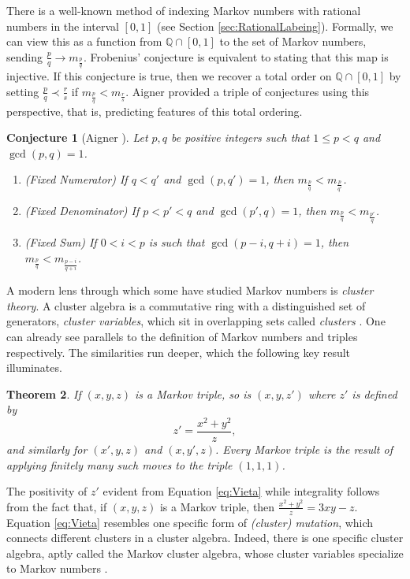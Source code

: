 \documentclass[12pt, letterpaper,table]{amsart}
\newtheorem{theorem}{Theorem}
\newtheorem{conjecture}[theorem]{Conjecture}
\theoremstyle{remark}
\newcommand{\fpq}{\frac{p}{q}}
\newcommand{\frs}{\frac{r}{s}}
\begin{document}
There is a well-known method of indexing Markov numbers with rational numbers in the interval $[0,1]$ (see Section \ref{sec:RationalLabeing}). Formally, we can view this as a function from $\mathbb{Q} \cap [0,1]$ to the set of Markov numbers, sending $\frac{p}{q} \to m_{\frac{p}{q}}$. Frobenius' conjecture is equivalent to stating that this map is injective. If this conjecture is true, then we recover a total order on $\mathbb{Q} \cap [0,1]$ by setting $\fpq \prec \frs$ if $m_\fpq < m_\frs$. Aigner provided a triple of conjectures using this perspective, that is, predicting features of this total ordering.

\begin{conjecture}[Aigner \cite{aigner2013Markov}]\label{conj:Aigner}
Let $p,q$ be positive integers such that $1 \leq p < q$ and $\gcd(p,q) = 1$.
\begin{enumerate}
    \item (Fixed Numerator) If $q < q'$ and $\gcd(p,q') = 1$, then $m_\fpq < m_{\frac{p}{q'}}$.
    \item (Fixed Denominator) If $p < p'< q$ and $\gcd(p',q) = 1$, then $m_\fpq < m_{\frac{p'}{q}}$.
    \item (Fixed Sum) If $0 < i < p$ is such that $\gcd(p-i,q+i) = 1$, then $m_\fpq < m_{\frac{p-i}{q+i}}$.
\end{enumerate}
\end{conjecture}

A modern lens through which some have studied Markov numbers is \emph{cluster theory}. A cluster algebra is a commutative ring with a distinguished set of generators, \emph{cluster variables}, which sit in overlapping sets called \emph{clusters} \cite{fomin2002cluster}. One can already see parallels to the definition of Markov numbers and triples respectively. The similarities run deeper, which the following key result illuminates. 

\begin{theorem}\label{thm:MarkovTreeConnected}
If $(x,y,z)$ is a Markov triple, so is $(x,y,z')$ where $z'$ is defined by \begin{equation}
z' = \frac{x^2 + y^2}{z},\label{eq:Vieta}
\end{equation}
and similarly for $(x',y,z)$ and $(x,y',z)$. Every Markov triple is the result of applying finitely many such moves to the triple $(1,1,1)$. 
\end{theorem}

The positivity of $z'$ evident from Equation \ref{eq:Vieta} while integrality follows from the fact that, if $(x,y,z)$ is a Markov triple, then $\frac{x^2 + y^2}{z} = 3xy-z$. Equation \ref{eq:Vieta} resembles one specific form of \emph{(cluster) mutation}, which connects different clusters in a cluster algebra. Indeed, there is one specific cluster algebra, aptly called the Markov cluster algebra, whose cluster variables specialize to Markov numbers \cite{beineke2011cluster,propp2005combinatorics}. 
\end{document}
